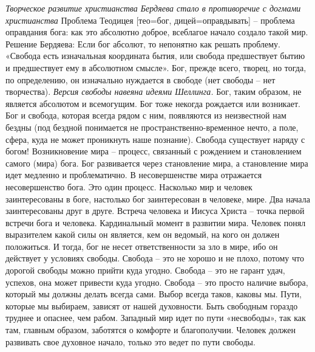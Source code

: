 \documentclass[12pt]{article}
\begin{document}
\textit{Творческое развитие христианства Бердяева стало в противоречие с догмами христианства}
Проблема Теодицея [тео=бог, дицей=оправдывать] – проблема оправдания бога: как это абсолютно доброе,
всеблагое начало создало такой мир.
Решение  Бердяева:  Если  бог  абсолют,  то  непонятно  как  решать  проблему.  «Свобода  есть  изначальная
координата бытия, или свобода предшествует бытию и предшествует ему в абсолютном смысле». Бог, прежде
всего, творец, но тогда, по определению, он изначально нуждается в свободе (нет свободы – нет творчества).
\textit{Версия свободы навеяна идеями Шеллинга.} Бог, таким образом, не является абсолютом и всемогущим. Бог
тоже некогда рождается или возникает. Бог и свобода, которая всегда рядом с ним, появляются из неизвестной
нам  бездны  (под  бездной  понимается  не  пространственно-временное  нечто,  а  поле,  сфера,  куда  не  может
проникнуть наше познание).
Свобода существует наряду с богом!
Возникновение мира – процесс, связанный с рождением и становлением самого (мира) бога. Бог развивается
через  становление  мира,  а  становление  мира  идет  медленно  и  проблематично.  В  несовершенстве  мира
отражается несовершенство бога. Это один процесс. Насколько мир и человек заинтересованы в боге, настолько
бог заинтересован в человеке, мире. Два начала заинтересованы друг в друге.
Встреча человека и Иисуса Христа – точка первой встречи бога и человека. Кардинальный момент в развитии
мира. Человек понял выразителем какой силы он является, кем он ведомый, на кого он должен положиться. И
тогда, бог не несет ответственности за зло в мире, ибо он действует у условиях свободы. 
Свобода – это не хорошо и не плохо, потому что дорогой свободы можно прийти куда угодно. Свобода – это не
гарант удач, успехов, она может привести куда угодно. Свобода – это просто наличие выбора, который мы
должны делать всегда сами. Выбор всегда таков, каковы мы. Пути, которые мы выбираем, зависят от нашей
духовности. 
Быть свободным гораздо труднее и опаснее, чем рабом. Западный мир идет по пути «несвободы», так как там,
главным образом, заботятся о комфорте и благополучии. Человек должен развивать свое духовное начало,
только это ведет по пути свободы.


\newpage
\end{document}
